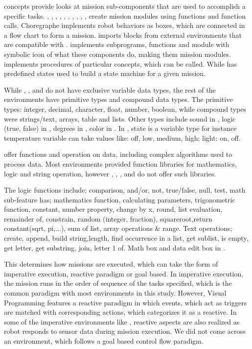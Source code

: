  concepts provide looks at mission sub-components that are used to accomplish a specific tasks.
 \metabot, \ardublockly, \openroberta, \choregraphe, \sphero, \robotmesh, \metabot, \makeblock, \ozoblockly, \turtlebot, create mission modules using functions and function calls. Choregraphe implements robot behaviors as boxes, which are connected in a flow chart to form a mission. \lego imports blocks from external environments that are compatible with \lego. \trik implements subprograms, functions and module with symbolic icon of what these components do, making them mission modules. \picaxe implements procedures of particular concepts, which can be called. While \missionlab has predefined states used to build a state machine for a given mission. 

 While \flyaq, \missionlab, \tivipe and \trik do not have exclusive variable data types, the rest of the environments have primitive types and compound data types. The primitive types: integer, decimal, character, float, number, boolean, while compound types were strings/text, arrays, table and lists. Other types include sound in \ozoblockly, logic (true, false) in \lego, degrees in \tello, color in \sphero. In \aseba, state is a variable type for instance temperature variable can take values like: off, low, medium, high; light: on, off. 

 offer functions and operation on data, including complex algorithms used to process data. Most environments provided function libraries for mathematics, logic and string operation, however \missionlab, \flyaq, \aseba, \codelab and \tello do not offer such libraries. 

The logic functions include; comparison, and/or, not, true/false, null, test,  math sub-feature has; mathematics function, calculating parameters, trigonometric function, constant, number property, change by x, round, list evaluation, remainder of, constrain, random (integer, fraction), squareroot,return constant(sqrt, pi,...), sum of list, array operations \& range. Text operations; create, append, build string,length, find occurrence in a list, get sublist, is empty, get letter, get substring, join, letter 1 of.  Math box and data edit box in \choregraphe.     

 This determines how missions are executed, which can take the form of imperative execution, reactive paradigm or goal based. In imperative execution, the mission runs in the order of sequence of the tasks specified, which is the common paradigm with most environments in this study. However, \aseba Visual Programming features a reactive paradigm in which events, which act as triggers are matched with corresponding actions, which categorizes it as a reactive. In some of the imperative environments like \picaxe, reactive aspects are also realized as robot responds to sensor data during mission execution. We did not come across an environment, which follows a goal based control flow paradigm.

